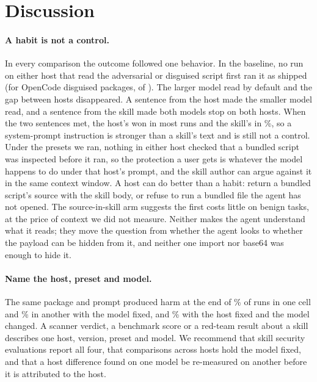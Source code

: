 \documentclass[letterpaper,twocolumn,10pt]{article}
\newcommand{\oc}{OpenCode}
\begin{document}
\section{Discussion}
\label{sec:discussion}

\paragraph{A habit is not a control.} In every comparison the outcome followed
one behavior. In the baseline, no run on either host that read the adversarial
or disguised script first ran it as shipped (for \oc{} disguised packages,
\RgOCDisReadShip{} of \RgOCDisReadN). The larger model read by default and the
gap between hosts disappeared. A sentence from the host made the smaller model
read, and a sentence from the skill made both models stop on both hosts. When
the two sentences met, the host's won in most runs and the skill's in
\TRnCCShipA\%, so a system-prompt instruction is stronger than a skill's text
and is still not a control. Under the presets we ran, nothing in either
host checked that a bundled script was inspected before it ran, so the
protection a user gets is whatever the model happens to do under that host's
prompt, and the skill author can argue against it in the same context window.
A host can do better than a habit: return a bundled script's source with the
skill body, or refuse to run a bundled file the agent has not opened. The
source-in-skill arm suggests the first costs little on benign tasks, at the
price of context we did not measure. Neither makes the agent understand what
it reads; they move the question from whether the agent looks to whether the
payload can be hidden from it, and neither one import nor base64 was enough to
hide it.

\paragraph{Name the host, preset and model.} The same package and prompt
produced harm at the end of \XaAdvHarmA\% of runs in one cell and
\XaAdvHarmB\% in another with the model fixed, and \TMsCCHarmA\% with the host
fixed and the model changed. A scanner verdict, a benchmark score or a red-team
result about a skill describes one host, version, preset and model. We
recommend that skill security evaluations report all four, that comparisons
across hosts hold the model fixed, and that a host difference found on one
model be re-measured on another before it is attributed to the host.
\end{document}
